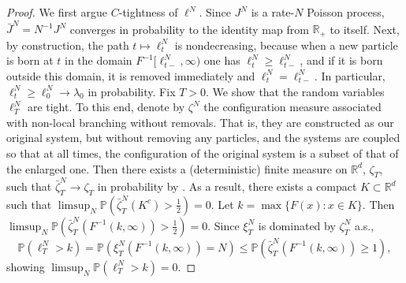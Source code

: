 \documentclass[11pt]{amsart}
\theoremstyle{plain}
\newcommand{\la}{\lambda}
\newcommand{\R}{{\mathbb R}}
\newcommand{\PP}{{\mathbb P}}
\newcommand{\iy}{\infty}
\newcommand{\F}{F}
\begin{document}
\begin{proof}
We first argue $C$-tightness of $\ell^N$.
Since $J^N$ is a rate-$N$ Poisson process, $\bar J^N=N^{-1}J^N$ converges in probability to the identity map from $\R_+$ to itself.
Next, by construction, the path $t\mapsto\ell^N_t$
is nondecreasing, because when a new particle
is born at $t$ in the domain $\F^{-1}[\ell^N_{t-},\iy)$
one has $\ell^N_t\ge\ell^N_{t-}$, and if it is born outside this domain,
it is removed immediately and $\ell^N_t=\ell^N_{t-}$.
In particular, $\ell^N_t\ge \ell^N_0\to \la_0$ in probability.
Fix $T>0$. We show that the random variables $\ell^N_T$ are tight.
To this end, denote by $\zeta^N$ the configuration measure
associated with non-local branching without removals. That is, they are
constructed as our original system, but without removing any particles,
and the systems are coupled so that at all times, the configuration
of the original system is a subset of that of the enlarged one.
Then there exists a (deterministic) finite measure on $\R^d$,
$\zeta_T$, such that $\bar\zeta^N_T\to\zeta_T$ in probability
by \cite[Theorem 5.3]{fou-mel}. As a result,
there exists a compact $K\subset\R^d$ such that
$\limsup_N\PP(\bar\zeta^N_T(K^c)>\frac{1}{2})=0$.
Let $k=\max\{\F(x):x\in K\}$. Then
$\limsup_N\PP(\bar\zeta^N_T(\F^{-1}(k,\iy))>\frac{1}{2})=0$.
Since $\xi^N_T$ is dominated by $\zeta^N_T$ a.s.,
\[
\PP(\ell^N_T>k)=\PP(\xi^N_T(\F^{-1}(k,\iy))=N)
\le \PP(\bar\zeta^N_T(\F^{-1}(k,\iy))\ge1),
\]
showing $\limsup_N\PP(\ell^N_T>k)=0$.


\end{proof}
\end{document}
